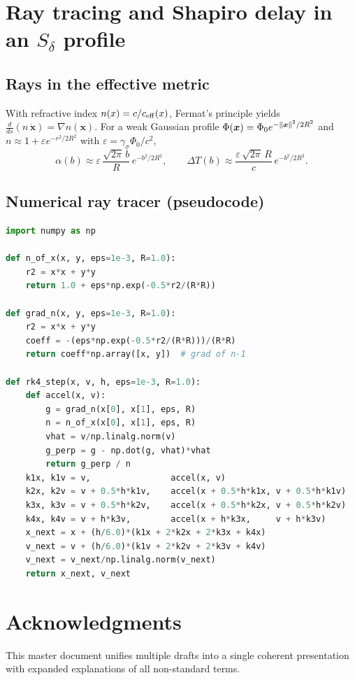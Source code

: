 \documentclass[12pt]{article}
\theoremstyle{definition}
\DeclarePairedDelimiter{\norm}{\lVert}{\rVert}
\begin{document}
\section{Ray tracing and Shapiro delay in an $S_\delta$ profile}\label{app:ray}
\subsection{Rays in the effective metric}
With refractive index $n(x)=c/c_{\rm eff}(x)$, Fermat's principle yields
\(
\frac{d}{ds}(n\,\dot{\bm x})=\nabla n(\bm x).
\)
For a weak Gaussian profile $\Phi(\bm x)=\Phi_0 e^{-\norm{\bm x}^2/2R^2}$ and $n\approx 1+\varepsilon e^{-r^2/2R^2}$ with $\varepsilon=\gamma_\sigma \Phi_0/c^2$,
\begin{equation}
\alpha(b)\approx \varepsilon\,\frac{\sqrt{2\pi}\,b}{R}\,e^{-b^2/2R^2},\qquad
\Delta T(b)\approx \frac{\varepsilon\,\sqrt{2\pi}\,R}{c}\,e^{-b^2/2R^2}.
\end{equation}

\subsection{Numerical ray tracer (pseudocode)}
\begin{lstlisting}[style=codeblock,language=Python,caption={RK4 ray tracing in 2D with Gaussian $n(x)$}]
import numpy as np

def n_of_x(x, y, eps=1e-3, R=1.0):
    r2 = x*x + y*y
    return 1.0 + eps*np.exp(-0.5*r2/(R*R))

def grad_n(x, y, eps=1e-3, R=1.0):
    r2 = x*x + y*y
    coeff = -(eps*np.exp(-0.5*r2/(R*R)))/(R*R)
    return coeff*np.array([x, y])  # grad of n-1

def rk4_step(x, v, h, eps=1e-3, R=1.0):
    def accel(x, v):
        g = grad_n(x[0], x[1], eps, R)
        n = n_of_x(x[0], x[1], eps, R)
        vhat = v/np.linalg.norm(v)
        g_perp = g - np.dot(g, vhat)*vhat
        return g_perp / n
    k1x, k1v = v,                accel(x, v)
    k2x, k2v = v + 0.5*h*k1v,    accel(x + 0.5*h*k1x, v + 0.5*h*k1v)
    k3x, k3v = v + 0.5*h*k2v,    accel(x + 0.5*h*k2x, v + 0.5*h*k2v)
    k4x, k4v = v + h*k3v,        accel(x + h*k3x,     v + h*k3v)
    x_next = x + (h/6.0)*(k1x + 2*k2x + 2*k3x + k4x)
    v_next = v + (h/6.0)*(k1v + 2*k2v + 2*k3v + k4v)
    v_next = v_next/np.linalg.norm(v_next)
    return x_next, v_next
\end{lstlisting}

\section*{Acknowledgments}
This master document unifies multiple drafts into a single coherent presentation with expanded explanations of all non-standard terms.
\end{document}
